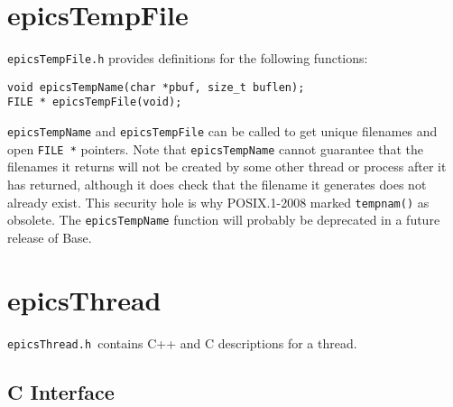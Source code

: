 \section{epicsTempFile}

\verb|epicsTempFile.h| provides definitions for the following functions:

\begin{verbatim}
void epicsTempName(char *pbuf, size_t buflen);
FILE * epicsTempFile(void);
\end{verbatim}

\verb|epicsTempName| and \verb|epicsTempFile| can be called to get unique filenames and open \verb|FILE *| pointers.
Note that \verb|epicsTempName| cannot guarantee that the filenames it returns will not be created by some other thread or process after it has returned, although it does check that the filename it generates does not already exist.
This security hole is why POSIX.1-2008 marked \verb|tempnam()| as obsolete.
The \verb|epicsTempName| function will probably be deprecated in a future release of Base.

\section{epicsThread}

\verb|epicsThread.h |contains C++ and C descriptions for a thread.

\subsection{C Interface}

